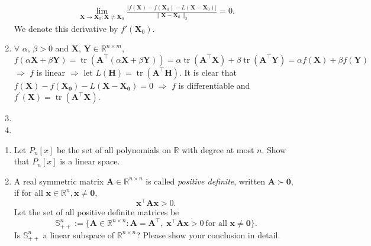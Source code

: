 \documentclass[11pt,letter,notitlepage]{article}
\newcommand{\tr}{ \operatorname{tr}  }
\theoremstyle{definition}
\begin{document}
\begin{solution}
\begin{enumerate}
	\begin{align*}
	    \lim_{\mathbf{X}\rightarrow\mathbf{X}_0;\mathbf{X}\neq\mathbf{X}_0}\frac{|f(\mathbf{X})-f(\mathbf{X}_0)-L(\mathbf{X}-\mathbf{X}_0)|}{\|\mathbf{X}-\mathbf{X}_0\|_2}=0.
	\end{align*}
	We denote this derivative by $f'(\mathbf{X}_0)$.
	\item
	$\forall$ $\alpha$, $\beta > 0$ and $\mathbf{X}$, $\mathbf{Y} \in \mathbb{R}^{n\times m}$,
	\[
	f(\alpha \mathbf{X} + \beta \mathbf{Y})
	=
	\tr\left(\mathbf{A}^{\top}\left(\alpha \mathbf{X} + \beta \mathbf{Y}\right)\right)
	=
	\alpha \tr\left(\mathbf{A}^{\top} \mathbf{X}\right) + \beta \tr\left(\mathbf{A}^{\top} \mathbf{Y}\right)
	=
	\alpha f(\mathbf{X}) + \beta f(\mathbf{Y})
	\]
	$\Longrightarrow$ $f$ is linear $\Longrightarrow$ let $L(\mathbf{H}) = \tr(\mathbf{A}^{\top}\mathbf{H})$. It is clear that $f(\mathbf{X}) - f(\mathbf{X_0}) - L(\mathbf{X} - \mathbf{X_0}) = 0$ $\Longrightarrow$ $f$ is differentiable and $f^{\prime}(\mathbf{X}) = \tr(\mathbf{A}^{\top}\mathbf{X})$.
	\item
	\item 
\end{enumerate}
\end{solution}

	\newpage

\begin{exercise}
\begin{enumerate}
    \item Let $P_n[x]$ be the set of all polynomials on $\mathbb{R}$ with degree at most $n$. Show that $P_n[x]$ is a linear space.

    \item A real symmetric matrix $\mathbf{A} \in \mathbb{R}^{n\times n}$ is called \emph{positive definite}, written $\mathbf A \succ \mathbf 0$, if for all $\mathbf x \in \mathbb{R}^n, \mathbf x\neq \mathbf 0$,
    \[
    \mathbf x^\top\mathbf A \mathbf x > 0.
    \]
    Let the set of all positive definite matrices be
    \[
    \mathbb S^n_{++} := \Big\{\mathbf A \in \mathbb R^{n\times n} : \mathbf A = \mathbf A^\top,\;\mathbf x^\top \mathbf A \mathbf x > 0\ \text{for all }\mathbf x\neq \mathbf 0\Big\}.
    \]
    Is $\mathbb S^n_{++}$ a linear subspace of $\mathbb R^{n\times n}$? Please show your conclusion in detail.
    
\end{enumerate}
    
\end{exercise}
\end{document}
